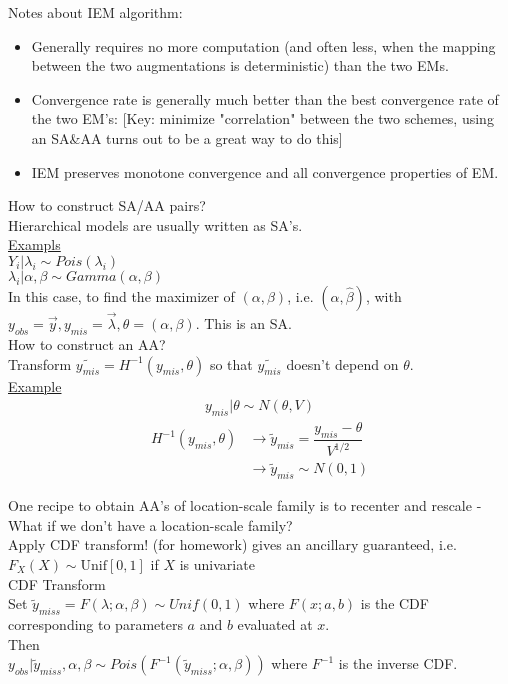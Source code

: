 \documentclass[12pt]{article}
\begin{document}
\begin{flushleft}
\bigskip
Notes about IEM algorithm:\\
\begin{itemize}
\item Generally requires no more computation (and often less, when the mapping between the two augmentations is deterministic) than the two EMs.
\item  Convergence rate is generally much better than the best convergence rate of the two EM's: [Key: minimize "correlation" between the two schemes, using an SA\&AA turns out to be a great way to do this]
\item IEM preserves monotone convergence and all convergence properties of EM.
\end{itemize}

\bigskip
How to construct SA/AA pairs?\\
Hierarchical models are usually written as SA's.\\
\underline{Exampls}\\
$Y_i | \lambda_i \sim Pois(\lambda_i)$ \\
$\lambda_i | \alpha, \beta \sim Gamma(\alpha, \beta) $ \\
In this case, to find the maximizer of $(\alpha, \beta)$, i.e. $(\widehat{\alpha}, \widehat{\beta})$, with $y_{obs} = \vec{y}, y_{mis} = \vec{\lambda}, \theta = (\alpha, \beta) $. This is an SA.\\
\bigskip
How to construct an AA?\\
Transform $\tilde{y_{mis}}=H^{-1}(y_{mis},\theta)$ so that $\tilde{y_{mis}}$ doesn't depend on $\theta$.\\
\underline{Example}\\
\begin{align*}
y_{mis}|\theta \sim N(\theta,V)
\end{align*} 
\begin{align*}
H^{-1}(y_{mis},\theta) & \rightarrow \tilde{y}_{mis}=\dfrac{y_{mis}-\theta}{V^{1/2}}\\
& \rightarrow \tilde{y}_{mis} \sim N(0,1)
\end{align*}

One recipe to obtain AA's of location-scale family is to recenter and rescale - What if we don't have a location-scale family?\\
Apply CDF transform! (for homework) gives an ancillary guaranteed, i.e. $F_{X}(X) \sim \textrm{Unif}[0,1]$ if $X$ is univariate \\
CDF Transform \\
Set $\tilde{y}_{miss} = F(\lambda; \alpha, \beta) \sim Unif(0,1)$ where $F(x;a,b)$ is the CDF corresponding to parameters $a$ and $b$ evaluated at $x$.\\
Then\\
$y_{obs} | \tilde{y}_{miss}, \alpha, \beta \sim Pois(F^{-1}(\tilde{y}_{miss};\alpha,\beta))$ where $F^{-1}$ is the inverse CDF.
	

	






\end{flushleft}
\end{document}

